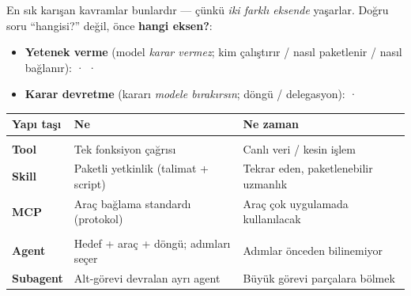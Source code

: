 

En sık karışan kavramlar bunlardır --- çünkü \emph{iki farklı eksende} yaşarlar.
Doğru soru ``hangisi?'' değil, önce \textbf{hangi eksen?}:

\begin{itemize}
  \item \textbf{Yetenek verme} (model \emph{karar vermez}; kim çalıştırır / nasıl paketlenir / nasıl bağlanır):  ·  · 
  \item \textbf{Karar devretme} (kararı \emph{modele bırakırsın}; döngü / delegasyon):  · 
\end{itemize}

\vspace{2pt}
\noindent\begin{tabularx}{\linewidth}{@{}>{\raggedright\arraybackslash}p{24mm} L L@{}}
\toprule
{\sffamily\bfseries\small Yapı taşı} & {\sffamily\bfseries\small Ne} & {\sffamily\bfseries\small Ne zaman} \\
\midrule
{} \\
\addlinespace[3pt]
\textbf{Tool} & Tek fonksiyon çağrısı & Canlı veri / kesin işlem \\
\textbf{Skill} & Paketli yetkinlik (talimat + script) & Tekrar eden, paketlenebilir uzmanlık \\
\textbf{MCP} & Araç bağlama standardı (protokol) & Araç çok uygulamada kullanılacak \\
\addlinespace[4pt]
 \\
\addlinespace[3pt]
\textbf{Agent} & Hedef + araç + döngü; adımları seçer & Adımlar önceden bilinemiyor \\
\textbf{Subagent} & Alt-görevi devralan ayrı agent & Büyük görevi parçalara bölmek \\
\bottomrule
\end{tabularx}

